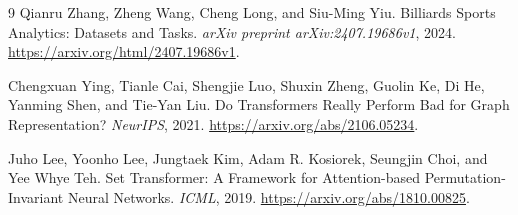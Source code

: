 \documentclass[12pt]{article}
\begin{document}
\begin{thebibliography}{9}
Qianru Zhang, Zheng Wang, Cheng Long, and Siu-Ming Yiu.
\newblock Billiards Sports Analytics: Datasets and Tasks.
\newblock \emph{arXiv preprint arXiv:2407.19686v1}, 2024.
\url{https://arxiv.org/html/2407.19686v1}. 

Chengxuan Ying, Tianle Cai, Shengjie Luo, Shuxin Zheng, Guolin Ke, Di He, Yanming Shen, and Tie-Yan Liu.
\newblock Do Transformers Really Perform Bad for Graph Representation?
\newblock \emph{NeurIPS}, 2021. \url{https://arxiv.org/abs/2106.05234}.

Juho Lee, Yoonho Lee, Jungtaek Kim, Adam R. Kosiorek, Seungjin Choi, and Yee Whye Teh.
\newblock Set Transformer: A Framework for Attention-based Permutation-Invariant Neural Networks.
\newblock \emph{ICML}, 2019. \url{https://arxiv.org/abs/1810.00825}.

\end{thebibliography}
\end{document}
